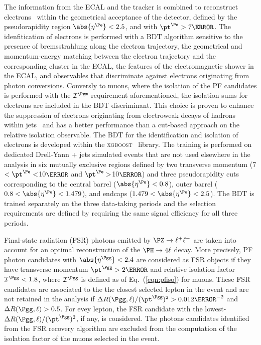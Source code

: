 { The information from the ECAL and the tracker is combined to reconstruct electrons~\cite{EGM-17-001} within the geometrical acceptance of the detector, defined by the pseudorapidity region $\abs{\eta^{\Pe}} < 2.5$, and with $\pt^{\Pe} > 7\GeV$.
The idenfitication of electrons is performed with a BDT algorithm sensitive to the presence of bremsstrahlung along the electron trajectory, the geometrical and momentum-energy matching between the
electron trajectory and the corresponding cluster in the ECAL, the features of the electromagnetic shower in the ECAL,
and observables that discriminate against electrons originating from photon conversions.
Conversly to muons, where the isolation of the PF candidates is performed with the ${\mathcal I}^{\Pgm}$ requirement aforementioned, the isolation sums for electrons are included in the BDT discriminant.
This choice is proven to enhance the suppression of electrons originating from electroweak decays of hadrons within jets~\cite{DPS-2018} and has a better performance than a cut-based approach on the relative isolation observable.
The BDT for the identification and isolation of electrons is developed within the \textsc{xgboost}~\cite{Chen:2016btl} library.
The training is performed on dedicated Drell-Yann + jets simulated events that are not used elsewhere in the analysis in six mutually exclusive regions defined by two transverse momentum (7$<\pt^{\Pe}<$10$\GeV$ and $\pt^{\Pe}>$10$\GeV$) and three pseudorapidity cuts corresponding to the central barrel ($\abs{\eta^{\Pe}}<0.8$), outer barrel ($0.8<\abs{\eta^{\Pe}}<1.479$), and endcaps ($1.479<\abs{\eta^{\Pe}}<2.5$).
The BDT is trained separately on the three data-taking periods and the selection requirements are defined by requiring the same signal efficiency for all three periods.\par}

Final-state radiation (FSR) photons emitted by $\PZ\rightarrow \ell^+\ell^-$ are taken into account for an optimal reconstruction of the $\PH\rightarrow4\ell$ decay. More precisely, PF photon candidates with $\abs{\eta^\Pgg}<2.4$ are considered as FSR objects if they have transverse momentum $\pt^{\Pgg} > 2 \GeV$ and relative isolation factor ${\mathcal I}^{\Pgg} <1.8$, where ${\mathcal I}^{\Pgg}$ is defined as of Eq.~(\ref{eqn:pfiso}) for muons.
These FSR candidates are associated to the the closest selected lepton in the event and are not retained in the analysis if $\Delta R(\Pgg,\ell)/(\pt^{\Pgg})^2>0.012 \GeV^{-2}$ and $\Delta R(\Pgg,\ell) > 0.5$.
For evey lepton, the FSR candidate with the lowest-$\Delta R(\Pgg,\ell)/(\pt^{\Pgg})^2$, if any, is considered.
The photons candidates identified from the FSR recovery algorithm are excluded from the computation of the isolation factor of the muons selected in the event.

